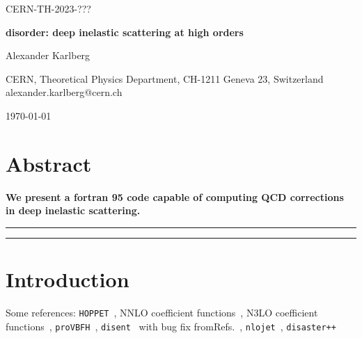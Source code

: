\documentclass[submission, PhysCodeb]{SciPost}
\newcommand{\hoppet}{{\tt HOPPET}}
\newcommand{\disent}{{\tt disent}}
\newcommand{\provbfh}{{\tt proVBFH}}
\newcommand{\disaster}{{\tt disaster++}}
\newcommand{\nlojet}{{\tt nlojet}}
\begin{document}
\begin{flushright}
CERN-TH-2023-???
\end{flushright}
\begin{center}{\Large \textbf{
disorder: deep inelastic scattering at high orders\\
}}\end{center}

\begin{center}
Alexander Karlberg
\end{center}

\begin{center}
CERN, Theoretical Physics Department, CH-1211 Geneva 23, Switzerland
\\
{\small \sf alexander.karlberg@cern.ch}
\end{center}

\begin{center}
\today
\end{center}


\section*{Abstract}
{\bf
We present a fortran 95 code capable of computing QCD corrections in deep inelastic scattering.
}


\vspace{10pt}
\noindent\rule{\textwidth}{1pt}
\tableofcontents\thispagestyle{fancy}
\noindent\rule{\textwidth}{1pt}
\vspace{10pt}


\section{Introduction}
\label{sec:intro}
Some references: \hoppet{}~\cite{Salam:2008qg}, NNLO coefficient functions~\cite{vanNeerven:1999ca,vanNeerven:2000uj}, N3LO coefficient functions~\cite{Moch:2004xu,Vermaseren:2005qc,Moch:2008fj,Davies:2016ruz}, \provbfh{}~\cite{Cacciari:2015jma}, \disent{}~\cite{Catani:1996vz} with bug fix fromRefs.~\cite{Borsa:2020ulb,Borsa:2020yxh}, \nlojet{}~\cite{Nagy:2001xb}, \disaster{}~\cite{Graudenz:1997gv}
\end{document}

